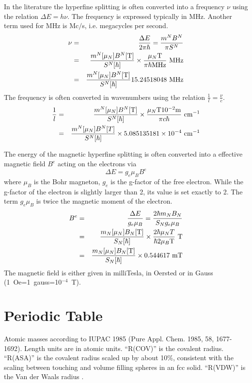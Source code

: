 \documentclass[final,12pt]{article}
\begin{document}
{{{{{{In the literature the hyperfine splitting is often converted into a
frequency $\nu$ using the relation $\Delta E=h\nu$. The frequency is
expressed typically in MHz. Another term used for MHz is Mc$/$s, i.e.
megacycles per second.
\begin{eqnarray*}
\nu&=&\frac{\Delta E}{2\pi\hbar} 
=\frac{m^N B^N}{\pi S^N}
\\
&=&
\frac{m^N[\mu_N]B^N[{\rm T}]}{S^N[\hbar]}
\times\frac{\mu_N {\rm T}}{\pi \hbar {\rm MHz}}\ {\rm MHz}
\\
&=&\frac{m^N[\mu_N]B^N[{\rm T}]}{S^N[\hbar]} 15.24518048\ {\rm MHz}
\end{eqnarray*}
The frequency is often converted in wavenumbers using the relation
$\frac{1}{l}=\frac{\nu}{c}$.
\begin{eqnarray*}
\frac{1}{l}&=&
\frac{m^N[\mu_N]B^N[{\rm T}]}{S^N[\hbar]} \times\frac{\mu_N {\rm T}
  10^{-2}{\rm m}}{\pi c\hbar
  }\ {\rm cm}^{-1}
\\
&=&
\frac{m^N[\mu_N]B^N[T]}{S^N[\hbar]} \times 5.085135181\times 10^{-4}\ {\rm cm}^{-1}
\end{eqnarray*}


The energy of the magnetic hyperfine splitting is often converted into
a effective magnetic field $B^e$ acting on the electrons via
\begin{displaymath}
\Delta E=g_e\mu_B B^e
\end{displaymath}
where $\mu_B$ is the Bohr magneton, $g_e$ is the g-factor of the free
electron. While the g-factor of the electron is slightly larger than
2, its value is set exactly to 2. The term $g_e\mu_B$ is twice the
magnetic moment of the electron. 
\begin{eqnarray*}
B^e&=&\frac{\Delta E}{g_e\mu_B}=\frac{2\hbar m_N B_N}{S_N g_e\mu_B}
\\
&=&\frac{m_N[\mu_N]B_N[{\rm T}]}{S_N[\hbar]}\times 
\frac{2\hbar\mu_N T}{\hbar 2\mu_B {\rm T}}\ {\rm T} 
\\
&=& \frac{m_N[\mu_N]B_N[{\rm T}]}{S_N[\hbar]}\times 0.544617\ {\rm mT}
\end{eqnarray*}
The magnetic field is either given in
milliTesla, in Oersted or in Gauss (1~Oe=1~gauss=10$^{-4}$~T).

\newpage
\section{Periodic Table}
Atomic masses according to IUPAC 1985 (Pure Appl. Chem. 1985, 58,
1677-1692). Length units are in atomic units. ``R(COV)'' is the covalent radius.
``R(ASA)'' is the covalent radius scaled up by about 10\%, consistent
with the scaling between touching and volume filling spheres in an fcc
solid. ``R(VDW)'' is the Van der Waals radius \cite{rappe92_jacs114_10024}.

}}}}}}
\end{document}
